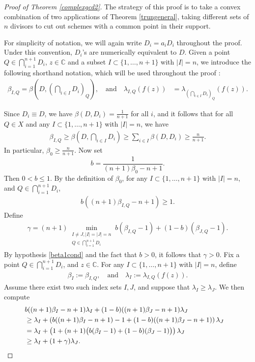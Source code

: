 \documentclass[10pt]{amsart}
\numberwithin{equation}{section}
\theoremstyle{plain}
\theoremstyle{definition}
\begin{document}
 \begin{proof}[Proof of Theorem \ref{complexgcd2}]
The strategy of this proof is to take a convex combination of two applications of Theorem \ref{trungeneral}, taking different sets of $n$ divisors to cut  out schemes with a common point in their support.

For simplicity of notation, we will again write $D_i=a_iD_i$ throughout the proof.    Under this convention, $D_i$'s are numerically equivalent to $D$. Given a point  $Q\in \bigcap_{i=1}^{n+1}D_i $, $z\in\mathbb C$ and  a subset $I \subset \{1,\ldots,n+1\}$ with $|I|=n$,  we introduce the following shorthand notation, which will be used throughout the proof
:\begin{align}\label{shortnotation}
\beta_{I,Q}=\beta(D,(\bigcap_{i \in I} D_i)_{Q}),\quad\text{and}\quad
\lambda_{I,Q}(f(z))&=\lambda_{(\bigcap_{i \in I} D_i)_{Q}}(f(z)). 
\end{align}


Since $D_i\equiv D$, we have $\beta(D,D_i)=\frac{1}{n+1}$ for all $i$, and it follows that for all $Q\in X$ and any $I \subset \{1,\ldots,n+1\}$ with $|I|=n$, we have
\begin{align*}
\beta_{I,Q}\geq \beta(D,\bigcap_{i \in I}D_{i})\geq \sum_{i \in I}\beta(D,D_i)\geq \frac{n}{n+1}.
\end{align*}
In particular, $\beta_0\geq \frac{n}{n+1}$.
Now set 
$$
b = \frac{1}{(n+1)\beta_0-n+1}.
$$ Then $0<b\leq 1$.   By the definition of $\beta_0$, for any $I \subset \{1,\ldots,n+1\}$ with $|I|=n$, and $Q\in  \bigcap_{i=1}^{n+1} D_{i}  $, 
\begin{align}\label{bbeta}
b ( (n+1)\beta_{I,Q}  -n+1 ) \geq 1. 
\end{align}
Define
\begin{align*}
\gamma=(n+1)\min_{\substack{I\neq J,|I|=|J|=n\\Q\in  \bigcap_{i=1}^{n+1} D_{i}  }} b(\beta_{I,Q}-1)+(1-b)(\beta_{J,Q} -1).
\end{align*}
By hypothesis \eqref{beta1cond} and the fact that $b>0$, it follows that $\gamma>0$.  Fix a point $Q\in \bigcap_{i=1}^{n+1}D_i $, and $z\in\mathbb C$.  For any $I \subset \{1,\ldots,n+1\}$ with $|I|=n$, define
\begin{align*}
\beta_{I} :=\beta_{I,Q}, \quad\text{and}\quad
\lambda_{I} :=\lambda_{I,Q}(f(z)). 
\end{align*}
Assume there exist two such index sets  $I,J$, and suppose that $\lambda_{I}\geq \lambda_{J}$.  We then compute
\begin{align}\label{gammabeta}
&b((n+1)\beta_{I}-n+1)\lambda_{I}+(1-b)((n+1)\beta_{J}-n+1)\lambda_{J}\cr
&\geq \lambda_{I}+\left(b((n+1)\beta_{I}-n+1)-1+(1-b)((n+1)\beta_{J}-n+1) \right)\lambda_{J}\cr
&= \lambda_{I}+\left(1+  (n+1)\big(b(\beta_{I}-1)+(1-b)(\beta_{J}-1)  \big) \right) \lambda_{J}\cr
&\geq \lambda_{I}+(1+\gamma)\lambda_{J}.
\end{align}


\end{proof}
\end{document}
